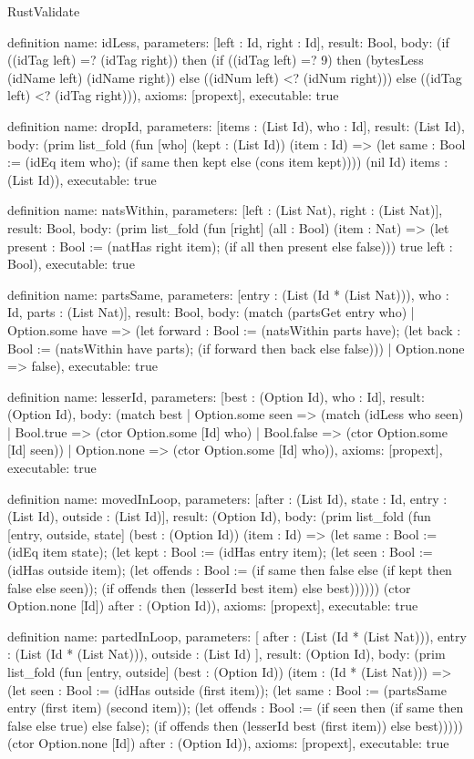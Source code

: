 \begin{lexlean}{RustValidate}
\begin{semanticmodule}
definition{
  name: idLess,
  parameters: [left : Id, right : Id],
  result: Bool,
  body: (if ((idTag left) =? (idTag right)) then (if ((idTag left) =? 9) then (bytesLess (idName left) (idName right)) else ((idNum left) <? (idNum right))) else ((idTag left) <? (idTag right))),
  axioms: [propext],
  executable: true
}

definition{
  name: dropId,
  parameters: [items : (List Id), who : Id],
  result: (List Id),
  body: (prim list_fold (fun [who] (kept : (List Id)) (item : Id) => (let same : Bool := (idEq item who); (if same then kept else (cons item kept)))) (nil Id) items : (List Id)),
  executable: true
}

definition{
  name: natsWithin,
  parameters: [left : (List Nat), right : (List Nat)],
  result: Bool,
  body: (prim list_fold (fun [right] (all : Bool) (item : Nat) => (let present : Bool := (natHas right item); (if all then present else false))) true left : Bool),
  executable: true
}

definition{
  name: partsSame,
  parameters: [entry : (List (Id * (List Nat))), who : Id, parts : (List Nat)],
  result: Bool,
  body: (match (partsGet entry who)
    | Option.some have => (let forward : Bool := (natsWithin parts have); (let back : Bool := (natsWithin have parts); (if forward then back else false)))
    | Option.none => false),
  executable: true
}

definition{
  name: lesserId,
  parameters: [best : (Option Id), who : Id],
  result: (Option Id),
  body: (match best
    | Option.some seen => (match (idLess who seen)
      | Bool.true => (ctor Option.some [Id] who)
      | Bool.false => (ctor Option.some [Id] seen))
    | Option.none => (ctor Option.some [Id] who)),
  axioms: [propext],
  executable: true
}

definition{
  name: movedInLoop,
  parameters: [after : (List Id), state : Id, entry : (List Id), outside : (List Id)],
  result: (Option Id),
  body: (prim list_fold (fun [entry, outside, state] (best : (Option Id)) (item : Id) => (let same : Bool := (idEq item state); (let kept : Bool := (idHas entry item); (let seen : Bool := (idHas outside item); (let offends : Bool := (if same then false else (if kept then false else seen)); (if offends then (lesserId best item) else best)))))) (ctor Option.none [Id]) after : (Option Id)),
  axioms: [propext],
  executable: true
}

definition{
  name: partedInLoop,
  parameters: [
    after : (List (Id * (List Nat))),
    entry : (List (Id * (List Nat))),
    outside : (List Id)
  ],
  result: (Option Id),
  body: (prim list_fold (fun [entry, outside] (best : (Option Id)) (item : (Id * (List Nat))) => (let seen : Bool := (idHas outside (first item)); (let same : Bool := (partsSame entry (first item) (second item)); (let offends : Bool := (if seen then (if same then false else true) else false); (if offends then (lesserId best (first item)) else best))))) (ctor Option.none [Id]) after : (Option Id)),
  axioms: [propext],
  executable: true
}


\end{semanticmodule}
\end{lexlean}
